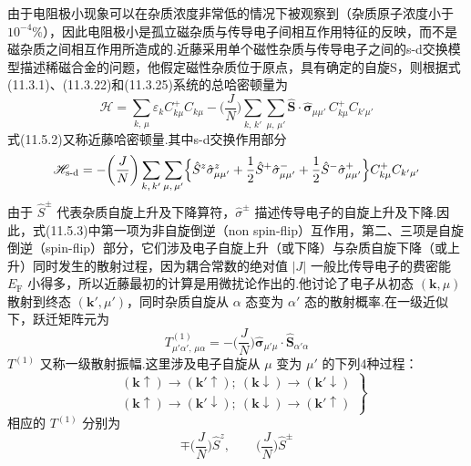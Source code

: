 由于电阻极小现象可以在杂质浓度非常低的情况下被观察到（杂质原子浓度小于 $10^{-4}\%$），因此电阻极小是孤立磁杂质与传导电子间相互作用特征的反映，而不是磁杂质之间相互作用所造成的.近藤采用单个磁性杂质与传导电子之间的s-d交换模型描述稀磁合金的问题，他假定磁性杂质位于原点，具有确定的自旋S，则根据式(11.3.1)、(11.3.22)和(11.3.25)系统的总哈密顿量为
\begin{equation}
  \mathscr{H}=\sum_{k,\,\mu}\varepsilon_{k}C^{+}_{k\mu}C_{k\mu}
  -\biggl(\frac{J}{N}\biggr)\sum_{k,\,k'}\sum_{\mu,\,\mu'}
  \hat{\boldsymbol{S}}\cdot\hat{\boldsymbol{\sigma}}_{\mu\mu'}\,
  C^{+}_{k\mu}C_{k'\mu'}
\end{equation}
式(11.5.2)又称近藤哈密顿量.其中s-d交换作用部分
\begin{equation}
  \mathscr{H}_{\mathrm{s}\text{-}\mathrm{d}}
  =-\biggl(\frac{J}{N}\biggr)\sum_{k,\,k'}\sum_{\mu,\,\mu'}
  \Bigl\{\hat{S}^{z}\hat{\sigma}^{z}_{\mu\mu'}
  +\frac{1}{2}\hat{S}^{+}\hat{\sigma}^{-}_{\mu\mu'}
  +\frac{1}{2}\hat{S}^{-}\hat{\sigma}^{+}_{\mu\mu'}\Bigr\}
  C^{+}_{k\mu}C_{k'\mu'}
\end{equation}
由于 $\hat{S}^{\pm}$ 代表杂质自旋上升及下降算符，$\hat{\sigma}^{\pm}$ 描述传导电子的自旋上升及下降.因此，式(11.5.3)中第一项为非自旋倒逆（non spin-flip）互作用，第二、三项是自旋倒逆（spin-flip）部分，它们涉及电子自旋上升（或下降）与杂质自旋下降（或上升）同时发生的散射过程，因为耦合常数的绝对值 $|J|$ 一般比传导电子的费密能 $E_{\mathrm{F}}$ 小得多，所以近藤最初的计算是用微扰论作出的.他讨论了电子从初态 $(\boldsymbol{k},\mu)$ 散射到终态 $(\boldsymbol{k}',\mu')$，同时杂质自旋从 $\alpha$ 态变为 $\alpha'$ 态的散射概率.在一级近似下，跃迁矩阵元为
\begin{equation}
  T^{(1)}_{\mu'\alpha',\,\mu\alpha}
  =-\biggl(\frac{J}{N}\biggr)\hat{\boldsymbol{\sigma}}_{\mu'\mu}
  \cdot\hat{\boldsymbol{S}}_{\alpha'\alpha}
\end{equation}
$T^{(1)}$ 又称一级散射振幅.这里涉及电子自旋从 $\mu$ 变为 $\mu'$ 的下列4种过程：
\begin{equation}
\left.
\begin{aligned}
  &(\boldsymbol{k}\uparrow)\to(\boldsymbol{k}'\uparrow);
  \ (\boldsymbol{k}\downarrow)\to(\boldsymbol{k}'\downarrow)\\
  &(\boldsymbol{k}\uparrow)\to(\boldsymbol{k}'\downarrow);
  \ (\boldsymbol{k}\downarrow)\to(\boldsymbol{k}'\uparrow)
\end{aligned}\right\}
\end{equation}
相应的 $T^{(1)}$ 分别为
\begin{equation}
  \mp\biggl(\frac{J}{N}\biggr)\hat{S}^{z},
  \qquad \biggl(\frac{J}{N}\biggr)\hat{S}^{\pm}
\end{equation}

